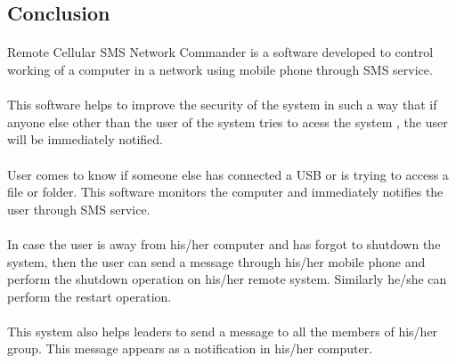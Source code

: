 \begin{center}
\section{Conclusion}
\end{center}
\paragraph{}
Remote Cellular SMS Network Commander is a software developed to control working of a computer in a network using mobile phone  through SMS service. 
\paragraph{}
This software helps to  improve the security of the system in such a way that if anyone else other than the user of the system tries to acess the system , the user will be immediately notified.
\paragraph{}
User comes to know if someone else has  connected a USB or is trying to access a file or folder. This software  monitors the computer and immediately notifies the user through SMS service.
\paragraph{}
In case the user is away from his/her computer and has forgot  to shutdown the system, then the user can send a message through his/her mobile phone and perform the shutdown operation on his/her remote system. Similarly he/she can perform the restart operation.
\paragraph{}
This system also helps leaders to send a message to all the members of his/her group. This message appears as a notification in his/her computer.
